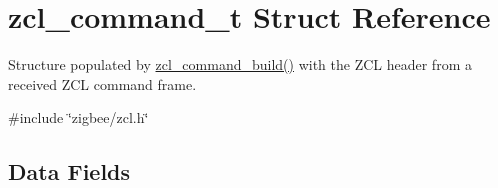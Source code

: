 \hypertarget{structzcl__command__t}{}\section{zcl\+\_\+command\+\_\+t Struct Reference}
\label{structzcl__command__t}


Structure populated by \hyperlink{group__zcl_gadeb35ab493fffec9ba1c33f658929136}{zcl\+\_\+command\+\_\+build()} with the Z\+CL header from a received Z\+CL command frame.  




{\ttfamily \#include \char`\"{}zigbee/zcl.\+h\char`\"{}}

\subsection*{Data Fields}
